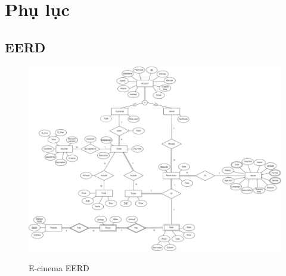 \section*{Phụ lục}
\subsection*{EERD}
\begin{figure}[H]
    \centering
    \href{https://app.diagrams.net/#G1-STSb4oAwxJJz8PLXzsCd5HWxfR61LCN}{\includegraphics[scale=0.4, angle=270]{images/EERD_E-Cinema.jpg}}
    \caption{E-cinema EERD}
    \label{fig:my_EERD}
\end{figure}
